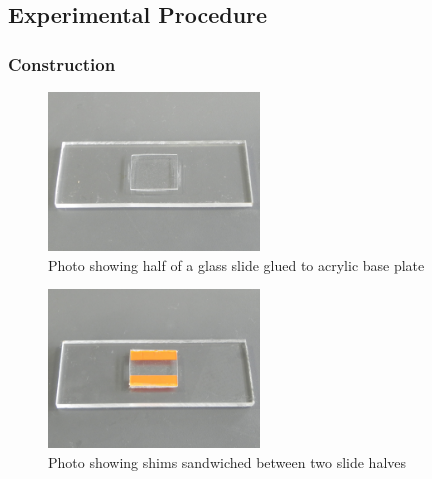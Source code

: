 \subsection{\label{sub:Experimental-Procedure}Experimental Procedure}


\subsubsection{Construction}

\begin{figure}[p] \begin{centering}
        \includegraphics[width=0.5\textwidth]{content/pt1/01-PowerHarvesting/graphics/Photo_streamingPotential_Assembly_Step1.JPG}
        \par\end{centering}

\centering{}\protect\caption{\label{Photo_streamingPotential_Assembly_Step1}Photo
    showing half of a glass slide glued to acrylic base plate} \end{figure}
\begin{figure}[p] \begin{centering}
        \includegraphics[width=0.5\textwidth]{content/pt1/01-PowerHarvesting/graphics/Photo_streamingPotential_Assembly_Step2.JPG}
        \par\end{centering}

\centering{}\protect\caption{\label{Photo_streamingPotential_Assembly_Step2}Photo
    showing shims sandwiched between two slide halves} \end{figure}
